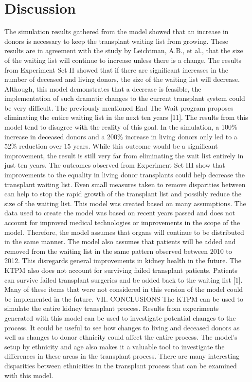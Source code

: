 \documentclass[9pt,a4paper,twocolumn]{scrartcl}
\begin{document}
\section{Discussion}
The simulation results gathered from the model showed that an increase in donors is necessary to keep the transplant waiting list from growing.  These results are in agreement with the study by Leichtman, A.B., et al., that the size of the waiting list will continue to increase unless there is a change. 
The results from Experiment Set II showed that if there are significant increases in the number of deceased and living donors, the size of the waiting list will decrease.  Although, this model demonstrates that a decrease is feasible, the implementation of such dramatic changes to the current transplant system could be very difficult.  The previously mentioned End The Wait program proposes eliminating the entire waiting list in the next ten years [11].  The results from this model tend to disagree with the reality of this goal.  In the simulation, a 100\% increase in deceased donors and a 200\% increase in living donors only led to a 52\% reduction over 15 years.  While this outcome would be a significant improvement, the result is still very far from eliminating the wait list entirely in just ten years.
The outcomes observed from Experiment Set III show that improvements to the equality in living donor transplants could help decrease the transplant waiting list.  Even small measures taken to remove disparities between can help to stop the rapid growth of the transplant list and possibly reduce the size of the waiting list.
This model was created based on many assumptions.  The data used to create the model was based on recent years passed and does not account for improved medical technologies or improvements in the scope of the model.  Therefore, the model assumes that organs will continue to be distributed in the same manner.  
The model also assumes that patients will be added and removed from the waiting list in the same pattern observed between 2010 to 2012.  This disregards general improvements in kidney health in the future.  The KTPM also does not account for surviving failed transplant patients.  Patients can survive failed transplant surgeries and be added back to the waiting list [1].
Many of these items that were not considered in this version of the model could be implemented in the future.  
VII.	CONCLUSIONS
The KTPM can be used to simulate the entire kidney transplant process.  Results from experiments generated with this model can be used to investigate potential changes to the process.  It could be useful to see how changes to living and deceased donors as well as changes to donor ethnicity could affect the entire process.  The model’s setup by ethnicity and age also makes it a valuable tool to investigate the differences in these areas in the transplant process.  There are many interesting disparities between ethnicities in the transplant process that can be examined with this model.
\end{document}
